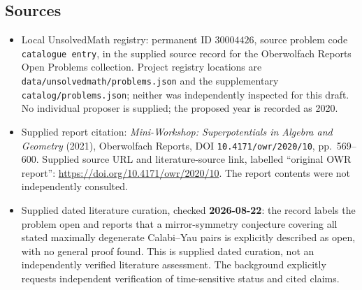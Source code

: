 \documentclass[11pt]{article}
\begin{document}
\subsection{Sources}
\begin{itemize}
\item Local UnsolvedMath registry: permanent ID \(30004426\), source problem code \texttt{catalogue entry}, in the supplied source record for the Oberwolfach Reports Open Problems collection. Project registry locations are \texttt{data/unsolvedmath/problems.json} and the supplementary \texttt{catalog/problems.json}; neither was independently inspected for this draft. No individual proposer is supplied; the proposed year is recorded as 2020.
\item Supplied report citation: \emph{Mini-Workshop: Superpotentials in Algebra and Geometry} (2021), Oberwolfach Reports, DOI \texttt{10.4171/owr/2020/10}, pp.\ 569--600. Supplied source URL and literature-source link, labelled ``original OWR report'': \url{https://doi.org/10.4171/owr/2020/10}. The report contents were not independently consulted.
\item Supplied dated literature curation, checked \textbf{2026-08-22}: the record labels the problem open and reports that a mirror-symmetry conjecture covering all stated maximally degenerate Calabi--Yau pairs is explicitly described as open, with no general proof found. This is supplied dated curation, not an independently verified literature assessment. The background explicitly requests independent verification of time-sensitive status and cited claims.
\end{itemize}
\end{document}

